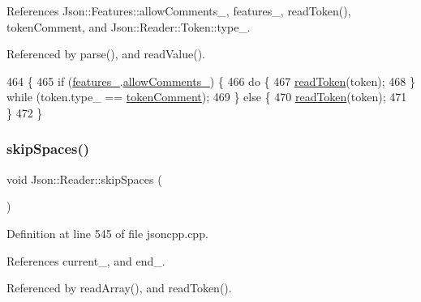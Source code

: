 References Json\+::\+Features\+::allow\+Comments\+\_\+, features\+\_\+, read\+Token(), token\+Comment, and Json\+::\+Reader\+::\+Token\+::type\+\_\+.



Referenced by parse(), and read\+Value().


\begin{DoxyCode}
464                                            \{
465   \textcolor{keywordflow}{if} (\hyperlink{class_json_1_1_reader_aa9984ff8f519b5541346157b7aebf97b}{features\_}.\hyperlink{class_json_1_1_features_a33afd389719624b6bdb23950b3c346c9}{allowComments\_}) \{
466     \textcolor{keywordflow}{do} \{
467       \hyperlink{class_json_1_1_reader_a7cb0631963cc0fd4ff6ed0f570976864}{readToken}(token);
468     \} \textcolor{keywordflow}{while} (token.type\_ == \hyperlink{class_json_1_1_reader_aa35e6ab574dc399a0a645ad98ed66bc9ae4fcf05c3b1ce462bacd34af0ccac32b}{tokenComment});
469   \} \textcolor{keywordflow}{else} \{
470     \hyperlink{class_json_1_1_reader_a7cb0631963cc0fd4ff6ed0f570976864}{readToken}(token);
471   \}
472 \}
\end{DoxyCode}
\mbox{\label{class_json_1_1_reader_a40d0f69d15aeb2d52ff78d794f5ab8b2}} 
\subsubsection{\texorpdfstring{skip\+Spaces()}{skipSpaces()}}
{\footnotesize\ttfamily void Json\+::\+Reader\+::skip\+Spaces (\begin{DoxyParamCaption}{ }\end{DoxyParamCaption})\hspace{0.3cm}{\ttfamily [private]}}



Definition at line 545 of file jsoncpp.\+cpp.



References current\+\_\+, and end\+\_\+.



Referenced by read\+Array(), and read\+Token().


